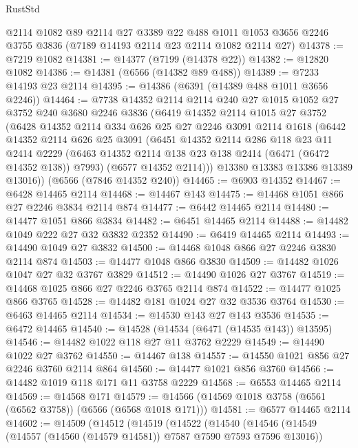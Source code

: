 \begin{lexlean}{RustStd}
\begin{coremodule}
    @2114
    @1082
    @89
    @2114
    @27
    @3389
    @22
    @488
    @1011
    @1053
    @3656
    @2246
    @3755
    @3836
    (@7189 @14193 @2114 @23 @2114 @1082 @2114 @27)
@14378 := @7219 @1082
@14381 := @14377 (@7199 (@14378 @22))
@14382 := @12820 @1082
@14386 := @14381 (@6566 (@14382 @89 @488))
@14389 := @7233 @14193 @23 @2114
@14395 := @14386 (@6391 (@14389 @488 @1011 @3656 @2246))
@14464 := @7738
    @14352
    @2114
    @2114
    @240
    @27
    @1015
    @1052
    @27
    @3752
    @240
    @3680
    @2246
    @3836
    (@6419
      @14352
      @2114
      @1015
      @27
      @3752
      (@6428
        @14352
        @2114
        @334
        @626
        @25
        @27
        @2246
        @3091
        @2114
        @1618
        (@6442
          @14352
          @2114
          @626
          @25
          @3091
          (@6451
            @14352
            @2114
            @286
            @118
            @23
            @11
            @2414
            @2229
            (@6463 @14352 @2114 @138 @23 @138 @2414 (@6471 (@6472 @14352 @138)) @7993)
            (@6577 @14352 @2114)))
        @13380
        @13383
        @13386
        @13389
        @13016))
    (@6566 (@7846 @14352 @240))
@14465 := @6903 @14352
@14467 := @6428 @14465 @2114
@14468 := @14467 @143
@14475 := @14468 @1051 @866 @27 @2246 @3834 @2114 @874
@14477 := @6442 @14465 @2114
@14480 := @14477 @1051 @866 @3834
@14482 := @6451 @14465 @2114
@14488 := @14482 @1049 @222 @27 @32 @3832 @2352
@14490 := @6419 @14465 @2114
@14493 := @14490 @1049 @27 @3832
@14500 := @14468 @1048 @866 @27 @2246 @3830 @2114 @874
@14503 := @14477 @1048 @866 @3830
@14509 := @14482 @1026 @1047 @27 @32 @3767 @3829
@14512 := @14490 @1026 @27 @3767
@14519 := @14468 @1025 @866 @27 @2246 @3765 @2114 @874
@14522 := @14477 @1025 @866 @3765
@14528 := @14482 @181 @1024 @27 @32 @3536 @3764
@14530 := @6463 @14465 @2114
@14534 := @14530 @143 @27 @143 @3536
@14535 := @6472 @14465
@14540 := @14528 (@14534 (@6471 (@14535 @143)) @13595)
@14546 := @14482 @1022 @118 @27 @11 @3762 @2229
@14549 := @14490 @1022 @27 @3762
@14550 := @14467 @138
@14557 := @14550 @1021 @856 @27 @2246 @3760 @2114 @864
@14560 := @14477 @1021 @856 @3760
@14566 := @14482 @1019 @118 @171 @11 @3758 @2229
@14568 := @6553 @14465 @2114
@14569 := @14568 @171
@14579 := @14566 (@14569 @1018 @3758 (@6561 (@6562 @3758)) (@6566 (@6568 @1018 @171)))
@14581 := @6577 @14465 @2114
@14602 := @14509
    (@14512
      (@14519
        (@14522
          (@14540
            (@14546
              (@14549 (@14557 (@14560 (@14579 @14581)) @7587 @7590 @7593 @7596 @13016))

\end{coremodule}
\end{lexlean}
